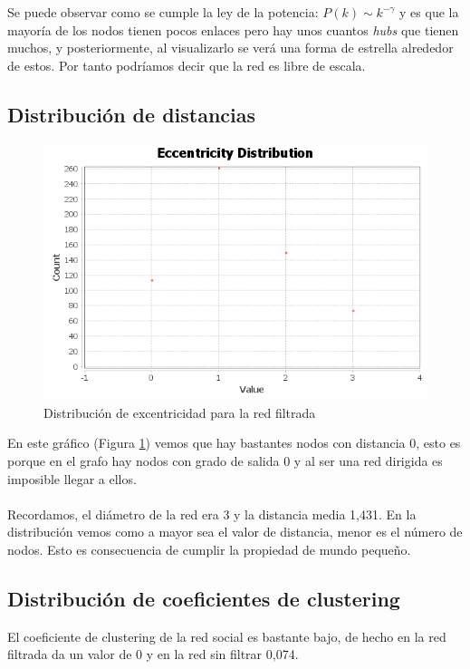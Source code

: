 Se puede observar como se cumple la ley de la potencia: $ P(k) \sim k^{-\gamma} $ y es que la mayoría de los nodos tienen pocos enlaces pero hay unos cuantos \textit{hubs} que tienen muchos, y posteriormente, al visualizarlo se verá una forma de estrella alrededor de estos. Por tanto podríamos decir que la red es libre de escala.

\subsection{Distribución de distancias}

\begin{figure}[H]
	\centering
	\includegraphics[width=12cm]{../images/eccentricity-distribution}
	\caption{Distribución de excentricidad para la red filtrada}
	\label{fig:eccentricity-distribution}
\end{figure}

En este gráfico (Figura \ref{fig:eccentricity-distribution}) vemos que hay bastantes nodos con distancia 0, esto es porque en el grafo hay nodos con grado de salida 0 y al ser una red dirigida es imposible llegar a ellos.
\\ \\
Recordamos, el diámetro de la red era 3 y la distancia media 1,431. En la distribución vemos como a mayor sea el valor de distancia, menor es el número de nodos. Esto es consecuencia de cumplir la propiedad de mundo pequeño. 

\subsection{Distribución de coeficientes de clustering}

El coeficiente de clustering de la red social es bastante bajo, de hecho en la red filtrada da un valor de 0 y en la red sin filtrar 0,074.
\\ \\

